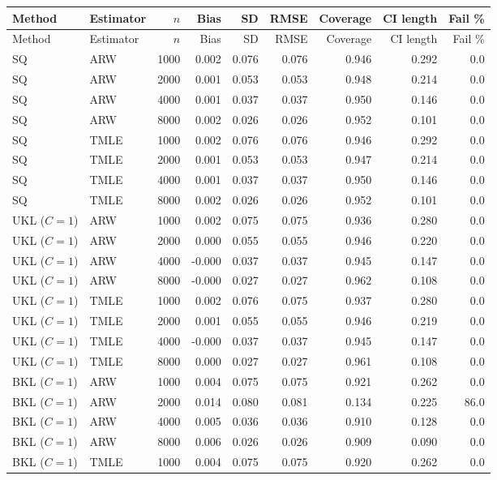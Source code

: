 \begin{tabular}{llrrrrrrr}
\hline
Method & Estimator & $n$ & Bias & SD & RMSE & Coverage & CI length & Fail \% \\
\hline
\endfirsthead
\hline
Method & Estimator & $n$ & Bias & SD & RMSE & Coverage & CI length & Fail \% \\
\hline
\endhead
SQ & ARW & 1000 & 0.002 & 0.076 & 0.076 & 0.946 & 0.292 & 0.0 \\
SQ & ARW & 2000 & 0.001 & 0.053 & 0.053 & 0.948 & 0.214 & 0.0 \\
SQ & ARW & 4000 & 0.001 & 0.037 & 0.037 & 0.950 & 0.146 & 0.0 \\
SQ & ARW & 8000 & 0.002 & 0.026 & 0.026 & 0.952 & 0.101 & 0.0 \\
SQ & TMLE & 1000 & 0.002 & 0.076 & 0.076 & 0.946 & 0.292 & 0.0 \\
SQ & TMLE & 2000 & 0.001 & 0.053 & 0.053 & 0.947 & 0.214 & 0.0 \\
SQ & TMLE & 4000 & 0.001 & 0.037 & 0.037 & 0.950 & 0.146 & 0.0 \\
SQ & TMLE & 8000 & 0.002 & 0.026 & 0.026 & 0.952 & 0.101 & 0.0 \\
UKL ($C=1$) & ARW & 1000 & 0.002 & 0.075 & 0.075 & 0.936 & 0.280 & 0.0 \\
UKL ($C=1$) & ARW & 2000 & 0.000 & 0.055 & 0.055 & 0.946 & 0.220 & 0.0 \\
UKL ($C=1$) & ARW & 4000 & -0.000 & 0.037 & 0.037 & 0.945 & 0.147 & 0.0 \\
UKL ($C=1$) & ARW & 8000 & -0.000 & 0.027 & 0.027 & 0.962 & 0.108 & 0.0 \\
UKL ($C=1$) & TMLE & 1000 & 0.002 & 0.076 & 0.075 & 0.937 & 0.280 & 0.0 \\
UKL ($C=1$) & TMLE & 2000 & 0.001 & 0.055 & 0.055 & 0.946 & 0.219 & 0.0 \\
UKL ($C=1$) & TMLE & 4000 & -0.000 & 0.037 & 0.037 & 0.945 & 0.147 & 0.0 \\
UKL ($C=1$) & TMLE & 8000 & 0.000 & 0.027 & 0.027 & 0.961 & 0.108 & 0.0 \\
BKL ($C=1$) & ARW & 1000 & 0.004 & 0.075 & 0.075 & 0.921 & 0.262 & 0.0 \\
BKL ($C=1$) & ARW & 2000 & 0.014 & 0.080 & 0.081 & 0.134 & 0.225 & 86.0 \\
BKL ($C=1$) & ARW & 4000 & 0.005 & 0.036 & 0.036 & 0.910 & 0.128 & 0.0 \\
BKL ($C=1$) & ARW & 8000 & 0.006 & 0.026 & 0.026 & 0.909 & 0.090 & 0.0 \\
BKL ($C=1$) & TMLE & 1000 & 0.004 & 0.075 & 0.075 & 0.920 & 0.262 & 0.0 \\

\end{tabular}
